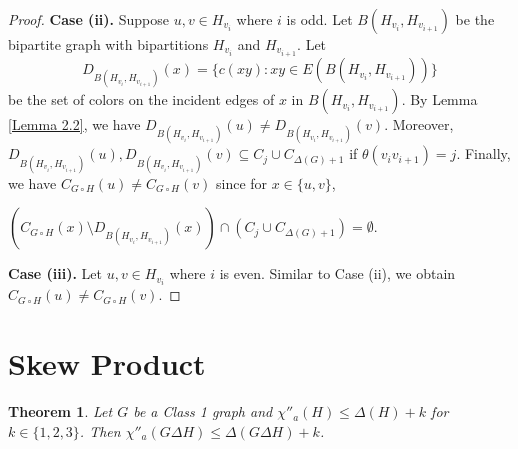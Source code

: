 \documentclass[12pt]{article}
\theoremstyle{definition}
\newtheorem{thm}[defn]{Theorem}
\begin{document}
\begin{proof}
\textbf{Case (ii).} Suppose $u,v\in H_{v_i}$ where $i$ is odd. 
Let $B(H_{v_i},H_{v_{i+1}})$ be the bipartite graph with bipartitions $H_{v_i}$ and $H_{v_{i+1}}$. 
Let 
\[D_{B(H_{v_i},H_{v_{i+1}})}(x)=\{c(xy):xy\in E(B(H_{v_i},H_{v_{i+1}}))\}\]
be the set of colors on the incident edges of $x$ in $B(H_{v_i},H_{v_{i+1}})$. 
By Lemma \ref{Lemma 2.2}, we have $D_{B(H_{v_i},H_{v_{i+1}})}(u)\neq D_{B(H_{v_i},H_{v_{i+1}})}(v)$.
Moreover, $D_{B(H_{v_i},H_{v_{i+1}})}(u), D_{B(H_{v_i},H_{v_{i+1}})}(v)\subseteq C_{j}\cup C_{\Delta(G)+1}$ if $\theta(v_iv_{i+1})=j$. 
Finally, we have
$
C_{G\circ H}(u)\neq C_{G \circ H}(v)
$
since for $x\in\{u,v\}$,
\begin{center}
$
(C_{G\circ H}(x)\setminus D_{B(H_{v_i},H_{v_{i+1}})}(x))\cap(C_j\cup C_{\Delta(G)+1})=\emptyset.
$    
\end{center}

\textbf{Case (iii).} Let $u,v\in H_{v_i}$ where $i$ is even. Similar to Case (ii), we obtain 
$C_{G\circ H}(u)\neq C_{G\circ H}(v)$.
\end{proof}



\section{Skew Product}

\begin{thm}\label{Theorem 5.1}
    {\em Let $G$ be a Class 1 graph and $\chi''_{a}(H)\leq \Delta(H)+k$ for $k\in \{1,2,3\}$. Then $\chi''_{a}(G\Delta H)\leq \Delta(G\Delta H) +k$.}
\end{thm}
\end{document}
